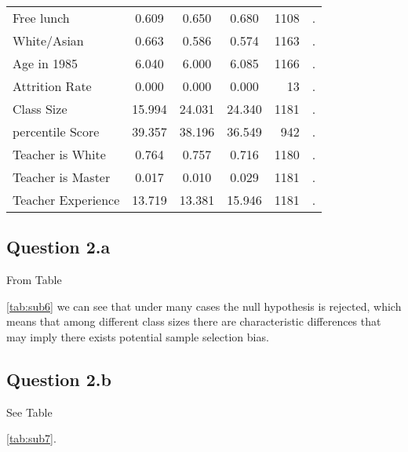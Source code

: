 \documentclass{article}
\begin{document}
{{{{{{\begin{table}[htbp]
\begin{tabular}{llcccrc}
    \multicolumn{2}{l}{Free lunch} & 0.609  & 0.650  & 0.680  & 1108  & . \\
    \multicolumn{2}{l}{White/Asian} & 0.663  & 0.586  & 0.574  & 1163  & . \\
    \multicolumn{2}{l}{Age in 1985} & 6.040  & 6.000  & 6.085  & 1166  & . \\
    \multicolumn{2}{l}{Attrition Rate} & 0.000  & 0.000  & 0.000  & 13    & . \\
    \multicolumn{2}{l}{Class Size} & 15.994  & 24.031  & 24.340  & 1181  & . \\
    \multicolumn{2}{l}{percentile Score} & 39.357  & 38.196  & 36.549  & 942   & . \\
    \multicolumn{2}{l}{Teacher is White} & 0.764  & 0.757  & 0.716  & 1180  & . \\
    \multicolumn{2}{l}{Teacher is Master} & 0.017  & 0.010  & 0.029  & 1181  & . \\
    \multicolumn{2}{l}{Teacher Experience} & 13.719  & 13.381  & 15.946  & 1181  & . \\
    \bottomrule
    \bottomrule
    \end{tabular}%
  \label{tab:addlabel}%
\end{table}%



\subsection*{Question 2.a}

From Table {\ref{tab:sub6} we can see that under many cases the null hypothesis is rejected, which means that among different class sizes there are characteristic differences that may imply there exists potential sample selection bias.

\subsection*{Question 2.b}

See Table {\ref{tab:sub7}.

}}}}}}}}
\end{document}
